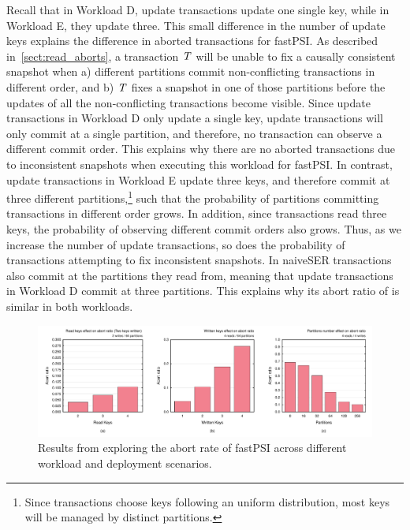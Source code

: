 Recall that in Workload D, update transactions update one single key, while in Workload E, they update three. This small difference in the number of update keys explains the difference in aborted transactions for fastPSI. As described in~\ref{sect:read_aborts}, a transaction $\mathit{T}$ will be unable to fix a causally consistent snapshot when a) different partitions commit non-conflicting transactions in different order, and b) $\mathit{T}$ fixes a snapshot in one of those partitions before the updates of all the non-conflicting transactions become visible. Since update transactions in Workload D only update a single key, update transactions will only commit at a single partition, and therefore, no transaction can observe a different commit order. This explains why there are no aborted transactions due to inconsistent snapshots when executing this workload for fastPSI. In contrast, update transactions in Workload E update three keys, and therefore commit at three different partitions,\footnote{Since transactions choose keys following an uniform distribution, most keys will be managed by distinct partitions.} such that the probability of partitions committing transactions in different order grows. In addition, since transactions read three keys, the probability of observing different commit orders also grows. Thus, as we increase the number of update transactions, so does the probability of transactions attempting to fix inconsistent snapshots. In naiveSER transactions also commit at the partitions they read from, meaning that update transactions in Workload D commit at three partitions. This explains why its abort ratio of  is similar in both workloads.

\begin{figure}[t]
\begin{center}
\includegraphics[width=\textwidth]{figures/psi_read_abort_bench.pdf}
\vspace{-1cm}
\end{center}
\caption{Results from exploring the abort rate of fastPSI across different workload and deployment scenarios.}
\label{fig:fastpsi_abort_rate}
\end{figure}

